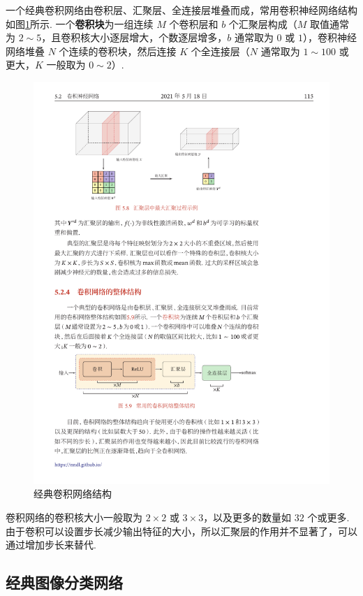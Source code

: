 \documentclass[12pt, a4paper, oneside]{ctexart}
\numberwithin{equation}{section}  %
\begin{document}
一个经典卷积网络由卷积层、汇聚层、全连接层堆叠而成，常用卷积神经网络结构如图\ref{fig-classicCNN}所示.
一个\textbf{卷积块}为一组连续 \(M\) 个卷积层和 \(b\) 个汇聚层构成（\(M\)
取值通常为 \(2\sim 5\)，且卷积核大小逐层增大，个数逐层增多，\(b\)
通常取为 \(0\) 或 \(1\)），卷积神经网络堆叠 \(N\)
个连续的卷积块，然后连接 \(K\) 个全连接层（\(N\) 通常取为 \(1\sim 100\)
或更大，\(K\) 一般取为 \(0\sim 2\)）.
\begin{figure}[htbp]
    \centering
    \includegraphics[scale=1.4]{经典卷积网络结构.pdf}
    \caption{经典卷积网络结构}
    \label{fig-classicCNN}
\end{figure}

卷积网络的卷积核大小一般取为 \(2\times 2\) 或
\(3\times 3\)，以及更多的数量如 \(32\) 个或更多.
由于卷积可以设置步长减少输出特征的大小，所以汇聚层的作用并不显著了，可以通过增加步长来替代.

\subsection{经典图像分类网络}
\end{document}
